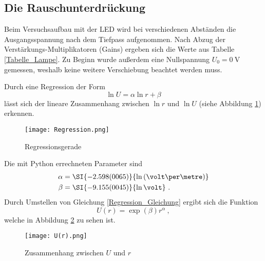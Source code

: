 \subsection{Die Rauschunterdrückung}\label{Rauschunterdruckung}
Beim Versuchsaufbau mit der LED wird bei verschiedenen Abständen die Ausgangsspannung nach dem Tiefpass aufgenommen. Nach Abzug der Verstärkungs-Multiplikatoren (Gains) ergeben sich die Werte aus Tabelle \ref{Tabelle_Lampe}.  Zu Beginn wurde außerdem eine Nullspannung $U_0=\SI{0}{\volt}$ gemessen, weshalb keine weitere Verschiebung beachtet werden muss. 

Durch eine Regression der Form
\begin{equation}\label{Regression_Gleichung}
	\ln U = \alpha\ln r +\beta
\end{equation}
lässt sich der lineare Zusammenhang zwischen $\ln r$ und $\ln U$ (siehe Abbildung \ref{Regression}) erkennen.
\begin{figure}[h!]
	\texttt{[image: Regression.png]}
	\caption{Regressionsgerade}
	\label{Regression}
\end{figure}
Die mit Python errechneten Parameter sind
\begin{align}
	\alpha &= \SI{-2.598(0065)}{\ln\left(\volt\per\metre\right)} \\
	\beta &= \SI{-9.155(0045)}{\ln\volt}\ .
\end{align}
Durch Umstellen von Gleichung \eqref{Regression_Gleichung} ergibt sich die Funktion
\begin{equation}
	U(r) = \exp(\beta) r^\alpha\ ,
\end{equation}
welche in Abbildung \ref{U(r)} zu sehen ist.
\begin{figure}[h!]
	\texttt{[image: U(r).png]}
	\caption{Zusammenhang zwischen $U$ und $r$}
	\label{U(r)}
\end{figure}